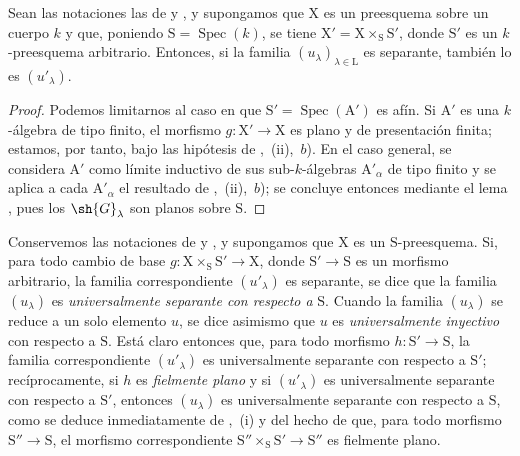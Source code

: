 \begin{proposition}[11.9.13]
\label{IV.11.9.13}
Sean las notaciones las de  y , y supongamos que $\mathrm{X}$ es un preesquema sobre un cuerpo $k$ y que, poniendo $\mathrm{S}=\operatorname{Spec}(k)$, se tiene $\mathrm{X}'=\mathrm{X}\times_\mathrm{S}\mathrm{S}'$, donde $\mathrm{S}'$ es un $k$-preesquema arbitrario.
Entonces, si la familia $(u_\lambda)_{\lambda\in\mathrm{L}}$ es separante, también lo es $(u'_\lambda)$.
\end{proposition}

\begin{proof}
Podemos limitarnos al caso en que $\mathrm{S}'=\operatorname{Spec}(\mathrm{A}')$ es afín.
Si $\mathrm{A}'$ es una $k$-álgebra de tipo finito, el morfismo $g:\mathrm{X}'\to\mathrm{X}$ es plano y de presentación finita; estamos, por tanto, bajo las hipótesis de ,~(ii),~$b$).
En el caso general, se considera $\mathrm{A}'$ como límite inductivo de sus sub-$k$-álgebras $\mathrm{A}'_\alpha$ de tipo finito y se aplica a cada $\mathrm{A}'_\alpha$ el resultado de ,~(ii),~$b$); se concluye entonces mediante el lema , pues los $\sh{G}_\lambda$ son planos sobre $\mathrm{S}$.
\end{proof}

\begin{env}[11.9.14]
\label{IV.11.9.14}
Conservemos las notaciones de  y , y supongamos que $\mathrm{X}$ es un $\mathrm{S}$-preesquema.
Si, para todo cambio de base $g:\mathrm{X}\times_\mathrm{S}\mathrm{S}'\to\mathrm{X}$, donde $\mathrm{S}'\to\mathrm{S}$ es un morfismo arbitrario, la familia correspondiente $(u'_\lambda)$ es separante, se dice que la familia $(u_\lambda)$ es \emph{universalmente separante con respecto a} $\mathrm{S}$.
Cuando la familia $(u_\lambda)$ se reduce a un solo elemento $u$, se dice asimismo que $u$ es \emph{universalmente inyectivo} con respecto a $\mathrm{S}$.
Está claro entonces que, para todo morfismo $h:\mathrm{S}'\to\mathrm{S}$, la familia correspondiente $(u'_\lambda)$ es universalmente separante con respecto a $\mathrm{S}'$; recíprocamente, si $h$ es \emph{fielmente plano} y si $(u'_\lambda)$ es universalmente separante con respecto a $\mathrm{S}'$, entonces $(u_\lambda)$ es universalmente separante con respecto a $\mathrm{S}$, como se deduce inmediatamente de ,~(i) y del hecho de que, para todo morfismo $\mathrm{S}''\to\mathrm{S}$, el morfismo correspondiente $\mathrm{S}''\times_\mathrm{S}\mathrm{S}'\to\mathrm{S}''$ es fielmente plano.
\end{env}

